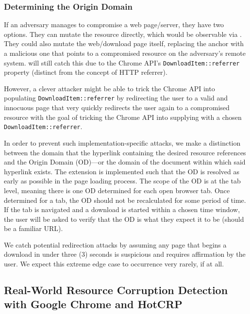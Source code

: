 \subsubsection{Determining the Origin Domain}

If an adversary manages to compromise a web page/server, they have two options.
They can mutate the resource directly, which would be observable via \SYSTEM{}.
They could also mutate the web/download page itself, replacing the anchor with a
malicious one that points to a compromised resource on the adversary's remote
system. \SYSTEM{} will still catch this due to the Chrome API's
\texttt{DownloadItem::referrer} property (distinct from the concept of HTTP
referrer).

However, a clever attacker might be able to trick the Chrome API into populating
\texttt{DownloadItem::referrer} by redirecting the user to a valid and innocuous
page that very quickly redirects the user again to a compromised resource with
the goal of tricking the Chrome API into supplying \SYSTEM{} with a chosen
\texttt{DownloadItem::referrer}.

In order to prevent such implementation-specific attacks, we make a distinction
between the domain that the hyperlink containing the desired resource references
and the Origin Domain (OD)---or the domain of the document within which said
hyperlink exists. The extension is implemented such that the OD is resolved as
early as possible in the page loading process. The scope of the OD is at the tab
level, meaning there is one OD determined for each open browser tab. Once
determined for a tab, the OD should not be recalculated for some period of time.
If the tab is navigated and a download is started within a chosen time window,
the user will be asked to verify that the OD is what they expect it to be
(should be a familiar URL).

We catch potential redirection attacks by assuming any page that begins a
download in under three (3) seconds is suspicious and requires affirmation by
the user. We expect this extreme edge case to occurrence very rarely, if at all.

\subsection{Real-World Resource Corruption Detection with Google Chrome and HotCRP}


